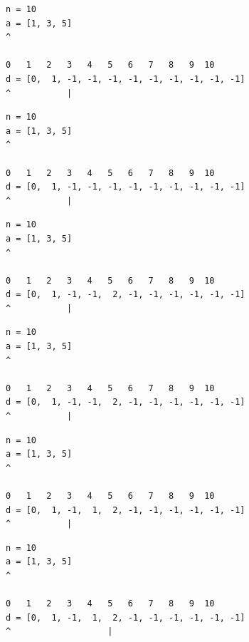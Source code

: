 \begin{frame}[fragile]
\begin{verbatim}
n = 10
a = [1, 3, 5]
^

0   1   2   3   4   5   6   7   8   9  10
d = [0,  1, -1, -1, -1, -1, -1, -1, -1, -1, -1]
^           |
\end{verbatim}
\end{frame}
\addtocounter{framenumber}{-1}

\begin{frame}[fragile]
\begin{verbatim}
n = 10
a = [1, 3, 5]
^

0   1   2   3   4   5   6   7   8   9  10
d = [0,  1, -1, -1, -1, -1, -1, -1, -1, -1, -1]
^           |
\end{verbatim}
\end{frame}
\addtocounter{framenumber}{-1}

\begin{frame}[fragile]
\begin{verbatim}
n = 10
a = [1, 3, 5]
^

0   1   2   3   4   5   6   7   8   9  10
d = [0,  1, -1, -1,  2, -1, -1, -1, -1, -1, -1]
^           |
\end{verbatim}
\end{frame}
\addtocounter{framenumber}{-1}

\begin{frame}[fragile]
\begin{verbatim}
n = 10
a = [1, 3, 5]
^

0   1   2   3   4   5   6   7   8   9  10
d = [0,  1, -1, -1,  2, -1, -1, -1, -1, -1, -1]
^           |
\end{verbatim}
\end{frame}
\addtocounter{framenumber}{-1}

\begin{frame}[fragile]
\begin{verbatim}
n = 10
a = [1, 3, 5]
^

0   1   2   3   4   5   6   7   8   9  10
d = [0,  1, -1,  1,  2, -1, -1, -1, -1, -1, -1]
^           |
\end{verbatim}
\end{frame}
\addtocounter{framenumber}{-1}

\begin{frame}[fragile]
\begin{verbatim}
n = 10
a = [1, 3, 5]
^

0   1   2   3   4   5   6   7   8   9  10
d = [0,  1, -1,  1,  2, -1, -1, -1, -1, -1, -1]
^                   |
\end{verbatim}
\end{frame}
\addtocounter{framenumber}{-1}

